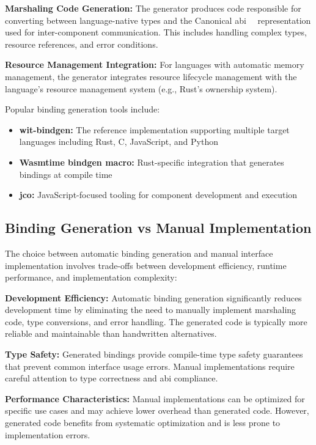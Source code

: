 \textbf{Marshaling Code Generation:} The generator produces code responsible for converting between language-native types and the Canonical \acrfull{abi}~\cite{abi}~\cite{cabi} representation used for inter-component communication. This includes handling complex types, resource references, and error conditions.

\textbf{Resource Management Integration:} For languages with automatic memory management, the generator integrates resource lifecycle management with the language's resource management system (e.g., Rust's ownership system).

Popular binding generation tools include:

\begin{itemize}
    \item \textbf{wit-bindgen:} The reference implementation supporting multiple target languages including Rust, C, JavaScript, and Python~\cite{wit_bindgen_git}
    \item \textbf{Wasmtime bindgen macro:} Rust-specific integration that generates bindings at compile time~\cite{wasmtime_bindgen_docs}
    \item \textbf{jco:} JavaScript-focused tooling for component development and execution~\cite{jco_docs}
\end{itemize}

\subsection{Binding Generation vs Manual Implementation}
\label{subsec:binding-comparison}

The choice between automatic binding generation and manual interface implementation involves trade-offs between development efficiency, runtime performance, and implementation complexity:

\textbf{Development Efficiency:} Automatic binding generation significantly reduces development time by eliminating the need to manually implement marshaling code, type conversions, and error handling. The generated code is typically more reliable and maintainable than handwritten alternatives.

\textbf{Type Safety:} Generated bindings provide compile-time type safety guarantees that prevent common interface usage errors. Manual implementations require careful attention to type correctness and \acrshort{abi} compliance.

\textbf{Performance Characteristics:} Manual implementations can be optimized for specific use cases and may achieve lower overhead than generated code. However, generated code benefits from systematic optimization and is less prone to implementation errors.

